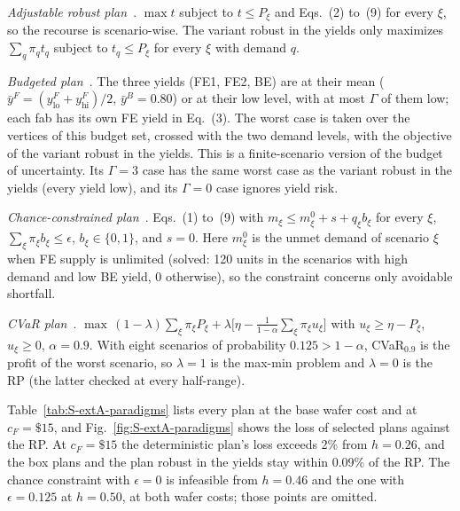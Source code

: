\emph{Adjustable robust plan}~\cite{bental2004adjustable}. $\max t$ subject to $t\le P_\xi$ and Eqs.~(2) to~(9) for every $\xi$, so the recourse is scenario-wise. The variant robust in the yields only maximizes $\sum_q \pi_q t_q$ subject to $t_q\le P_\xi$ for every $\xi$ with demand $q$.

\emph{Budgeted plan}~\cite{bertsimas2004}. The three yields (FE1, FE2, BE) are at their mean ($\bar y^F=(y^F_{\text{lo}}+y^F_{\text{hi}})/2$, $\bar y^B=0.80$) or at their low level, with at most $\Gamma$ of them low; each fab has its own FE yield in Eq.~(3). The worst case is taken over the vertices of this budget set, crossed with the two demand levels, with the objective of the variant robust in the yields. This is a finite-scenario version of the budget of uncertainty. Its $\Gamma=3$ case has the same worst case as the variant robust in the yields (every yield low), and its $\Gamma=0$ case ignores yield risk.

\emph{Chance-constrained plan}~\cite{charnes1959,luedtke2008sample}. Eqs.~(1) to~(9) with $m_\xi\le m^0_\xi+s+q_\xi b_\xi$ for every $\xi$, $\sum_\xi\pi_\xi b_\xi\le\epsilon$, $b_\xi\in\{0,1\}$, and $s=0$. Here $m^0_\xi$ is the unmet demand of scenario $\xi$ when FE supply is unlimited (solved: 120 units in the scenarios with high demand and low BE yield, 0 otherwise), so the constraint concerns only avoidable shortfall.

\emph{CVaR plan}~\cite{rockafellar2000}. $\max\,(1-\lambda)\sum_\xi\pi_\xi P_\xi+\lambda\big[\eta-\frac{1}{1-\alpha}\sum_\xi\pi_\xi u_\xi\big]$ with $u_\xi\ge\eta-P_\xi$, $u_\xi\ge0$, $\alpha=0.9$. With eight scenarios of probability $0.125>1-\alpha$, CVaR$_{0.9}$ is the profit of the worst scenario, so $\lambda=1$ is the max-min problem and $\lambda=0$ is the RP (the latter checked at every half-range).

Table~\ref{tab:S-extA-paradigms} lists every plan at the base wafer cost and at $c_F=\$15$, and Fig.~\ref{fig:S-extA-paradigms} shows the loss of selected plans against the RP. At $c_F=\$15$ the deterministic plan's loss exceeds 2\% from $h=0.26$, and the box plans and the plan robust in the yields stay within 0.09\% of the RP. The chance constraint with $\epsilon=0$ is infeasible from $h=0.46$ and the one with $\epsilon=0.125$ at $h=0.50$, at both wafer costs; those points are omitted.

